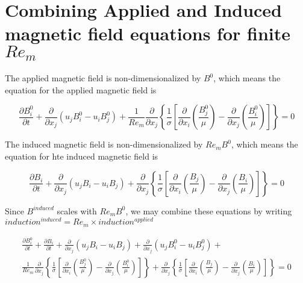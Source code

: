 \documentclass[11pt]{article}
\begin{document}
\section{Combining Applied and Induced magnetic field equations for finite \texorpdfstring{$Re_m$}{LG}}

The applied magnetic field is non-dimensionalized by $B^0$, which means the equation for the applied magnetic field is

\begin{equation}
	\frac{\partial B_i^0}{\partial t} 
	+ \frac{\partial}{\partial x_j} (u_j B_i^0 - u_i B_j^0) 
	+ \frac{1}{Re_m}
	\frac{\partial}{\partial x_j} 
	\left\{ \frac{1}{\sigma} 
	\left[ 
	\frac{\partial}{\partial x_i} 
	\left( \frac{B_j^0}{\mu} \right) - 
	\frac{\partial}{\partial x_j} 
	\left( \frac{B_i^0}{\mu} \right)
	\right]
	\right\} = 0
\end{equation}

The induced magnetic field is non-dimensionalized by $Re_m B^0$, which means the equation for hte induced magnetic field is


\begin{equation}
	\frac{\partial B_i}{\partial t} 
	+ \frac{\partial}{\partial x_j} (u_j B_i - u_i B_j) 
	+
	\frac{\partial}{\partial x_j} 
	\left\{ \frac{1}{\sigma} 
	\left[ 
	\frac{\partial}{\partial x_i} 
	\left( \frac{B_j}{\mu} \right) - 
	\frac{\partial}{\partial x_j} 
	\left( \frac{B_i}{\mu} \right)
	\right]
	\right\} = 0
\end{equation}

Since $B^{induced}$ scales with $Re_m B^0$, we may combine these equations by writing $induction^{induced}=Re_m \times induction^{applied}$

\begin{multline}
	\frac{\partial B_i^0}{\partial t} +
	\frac{\partial B_i}{\partial t} 
	+ \frac{\partial}{\partial x_j} (u_j B_i - u_i B_j) 
	+ \frac{\partial}{\partial x_j} (u_j B_i^0 - u_i B_j^0) 
	+ \\
	\frac{1}{Re_m}
	\frac{\partial}{\partial x_j} 
	\left\{ \frac{1}{\sigma} 
	\left[ 
	\frac{\partial}{\partial x_i} 
	\left( \frac{B_j^0}{\mu} \right) - 
	\frac{\partial}{\partial x_j} 
	\left( \frac{B_i^0}{\mu} \right)
	\right]
	\right\} 
	+
	\frac{\partial}{\partial x_j} 
	\left\{ \frac{1}{\sigma} 
	\left[ 
	\frac{\partial}{\partial x_i} 
	\left( \frac{B_j}{\mu} \right) - 
	\frac{\partial}{\partial x_j} 
	\left( \frac{B_i}{\mu} \right)
	\right]
	\right\}
	= 0
\end{multline}
\end{document}
